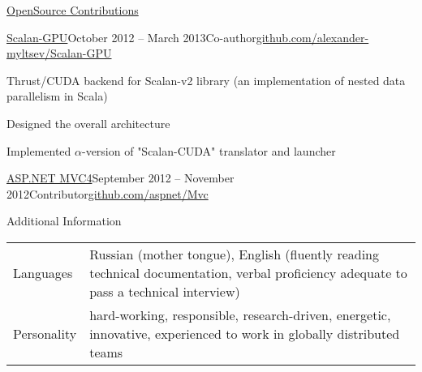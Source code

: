 \documentclass{resume} %
\begin{document}
\begin{rSection}{\href{https://github.com/alexander-myltsev?tab=repositories}{OpenSource Contributions}}
\begin{samepage}
\begin{rSubsection}{\href{http://github.com/alexander-myltsev/Scalan-GPU}{Scalan-GPU}}{October 2012 -- March 2013}{Co-author}{\href{http://github.com/alexander-myltsev/Scalan-GPU}{github.com/alexander-myltsev/Scalan-GPU}}
\item Thrust/CUDA backend for Scalan-v2 library (an implementation of nested data parallelism in Scala)
\item Designed the overall architecture 
\item Implemented $\alpha$-version of "Scalan-CUDA" translator and launcher
\end{rSubsection}
\end{samepage}

\begin{samepage}
\begin{rSubsectionEmpty}{\href{http://github.com/aspnet/Mvc}{ASP.NET MVC4}}{September 2012 -- November 2012}{Contributor}{\href{http://github.com/aspnet/Mvc}{github.com/aspnet/Mvc}}
\end{rSubsectionEmpty}
\end{samepage}

\end{rSection}


\begin{rSection}{Additional Information}

\begin{table}[h]
\begin{tabularx}{\textwidth}{l X}
Languages & Russian (mother tongue), English (fluently reading technical documentation, verbal proficiency adequate to pass a technical interview) \\
Personality & hard-working, responsible, research-driven, energetic, innovative, experienced to work in globally distributed teams
\end{tabularx}
\end{table}

\end{rSection}

\end{document}
